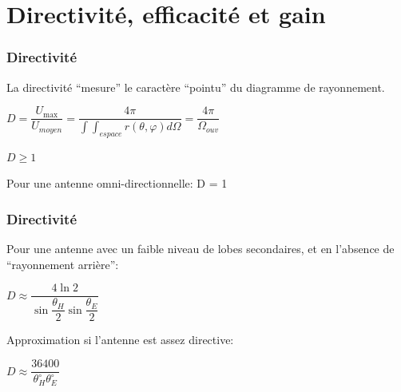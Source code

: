 \documentclass[
10pt,
aspectratio=169,
]{beamer}
\begin{document}
\section{Directivité, efficacité et gain}
\begin{frame}
\frametitle{Directivité}

La directivité ``mesure'' le caractère ``pointu'' du diagramme de rayonnement.

\vspace{0.5cm}
\begin{tcolorbox}[colframe=red,width=8cm]
\center$D=\dfrac{U_{\max}}{U_{moyen}}=\dfrac{4\pi}{\int\int_{espace}r(\theta,\varphi)d\Omega}=\dfrac{4\pi}{\Omega_{ouv}}$
\end{tcolorbox}


\vspace{0.5cm}
\begin{tcolorbox}[colframe=red,width=2.5cm]
\center$D\geq 1$
\end{tcolorbox}

\vspace{0.5cm}
Pour une antenne omni-directionnelle: D = 1

\end{frame}

\begin{frame}
\frametitle{Directivité}

Pour une antenne avec un faible niveau de lobes secondaires, et en
l'absence de ``rayonnement arrière'':

\vspace{0.5cm}
\begin{tcolorbox}[colframe=red,width=5cm]
\center$D\approx\dfrac{4\ln 2}{\sin\dfrac{\theta_H}{2}\sin\dfrac{\theta_E}{2}}$
\end{tcolorbox}

\vspace{0.5cm}

Approximation si l'antenne est assez directive:

\begin{tcolorbox}[colframe=red,width=3.5cm]
\center$D\approx\dfrac{36400}{\theta_H^\circ\theta_E^\circ}$
\end{tcolorbox}

\end{frame}
\end{document}

